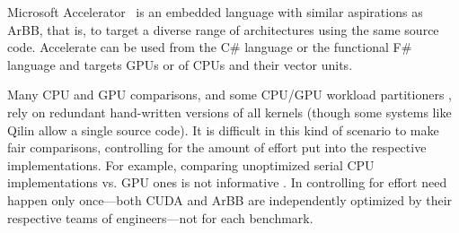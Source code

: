 Microsoft Accelerator~\cite{ACCELERATOR} is an embedded language with similar 
aspirations as ArBB, that is, to target a diverse range of architectures using the 
same source code. Accelerate can be used from the C\# language or the 
functional F\# language and targets GPUs or of CPUs and their
vector units.


Many CPU and GPU comparisons, and some CPU/GPU workload partitioners \cite{merge}, rely on
redundant hand-written versions of all kernels
(though some systems like Qilin \cite{qilin} allow a single source code).
It is difficult in this kind of scenario
to make fair comparisons, controlling for the
amount of effort put into the respective implementations.
For example, comparing unoptimized serial CPU implementations vs. GPU
ones is not informative \cite{debunking-dubey}.
In \systemname{} controlling for effort
need happen only once---both CUDA and ArBB are
independently optimized by their respective teams of engineers---not for each benchmark.




